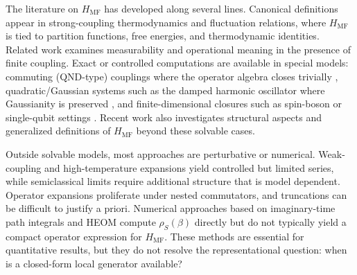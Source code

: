 The literature on $H_{\mathrm{MF}}$ has developed along several lines.
Canonical definitions appear in strong-coupling thermodynamics and fluctuation
relations, where $H_{\mathrm{MF}}$ is tied to partition functions, free
energies, and thermodynamic identities\cite{campisiFluctuationTheoremArbitrary2009,jarzynskiNonequilibriumWorkTheorem2004,jarzynskiStochasticMacroscopicThermodynamics2017,talknerColloquiumStatisticalMechanics2020,seifertFirstSecondLaw2016}.
Related work examines measurability and operational meaning in the presence of
finite coupling\cite{strasbergMeasurabilityNonequilibriumThermodynamics2020,rivasStrongCouplingThermodynamics2020,trushechkinOpenQuantumSystem2022}.
Exact or controlled computations are available in special models: commuting
(QND-type) couplings where the operator algebra closes trivially
\cite{campisiTalknerHanggi2009Solvable}, quadratic/Gaussian systems such as the
damped harmonic oscillator where Gaussianity is preserved
\cite{caldeiraQuantumTunnellingDissipative1983a,grabertQuantumBrownianMotion1988,hiltHamiltonianMeanForce2011},
and finite-dimensional closures such as spin-boson or single-qubit settings
\cite{leggettDynamicsDissipativeTwostate1987}.
Recent work also investigates structural aspects and generalized definitions of
$H_{\mathrm{MF}}$ beyond these solvable cases\cite{burkeStructureHamiltonianMean2024,duGeneralizedHamiltonianMeanforce2025a}.

Outside solvable models, most approaches are perturbative or numerical.
Weak-coupling and high-temperature expansions yield controlled but limited
series\cite{cresserWeakUltrastrongCoupling2021a}, while semiclassical limits
require additional structure that is model dependent\cite{talknerColloquiumStatisticalMechanics2020}.
Operator expansions proliferate under nested commutators, and truncations can be
difficult to justify a priori. Numerical approaches based on imaginary-time path
integrals and HEOM compute $\rho_S(\beta)$ directly but do not typically yield a
compact operator expression for $H_{\mathrm{MF}}$\cite{moixEquilibriumreducedDensityMatrix2012,chenRigorousStochasticMatrix2014,tanimuraReducedHierarchicalEquations2014,songCalculationCorrelatedInitial2015,makriExploitingClassicalDecoherence2014}.
These methods are essential for quantitative results, but they do not resolve
the representational question: when is a closed-form local generator available?

